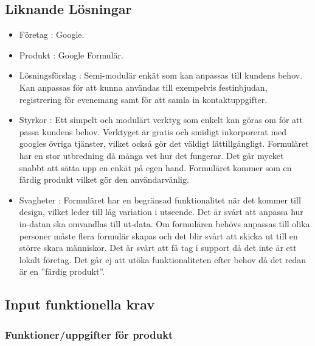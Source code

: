 \documentclass{article}
\begin{document}
    \subsection{Liknande Lösningar}

\begin{itemize}
    \item Företag : Google.
     \item Produkt : Google Formulär.
     \item Lösningsförslag : Semi-modulär enkät som kan anpassas till kundens behov. Kan anpassas för att kunna användas till exempelvis festinbjudan, registrering för evenemang samt för att samla in kontaktuppgifter.
   

    \item Styrkor : Ett simpelt och modulärt verktyg som enkelt kan göras om för att passa kundens behov. Verktyget är gratis och smidigt inkorporerat med googles övriga tjänster,  vilket också gör det väldigt lättillgängligt. Formuläret har en stor utbredning då många vet hur det fungerar. Det går mycket snabbt att sätta upp en enkät på egen hand. Formuläret kommer som en färdig produkt vilket gör den användarvänlig.
    
    \item Svagheter : Formuläret har en begränsad funktionalitet när det kommer till design, vilket leder till låg variation i utseende. Det är svårt att anpassa hur in-datan ska omvandlas till ut-data. Om formulären behövs anpassas till olika personer måste flera formulär skapas och det blir svårt att  skicka ut till en större skara människor. Det är svårt att få tag i support då det inte är ett lokalt företag. Det går ej att utöka funktionaliteten efter behov då det redan är en ”färdig produkt”.
\end{itemize}
    
\subsection{Input funktionella krav}
\subsubsection{Funktioner/uppgifter för produkt}
  
\end{document}
